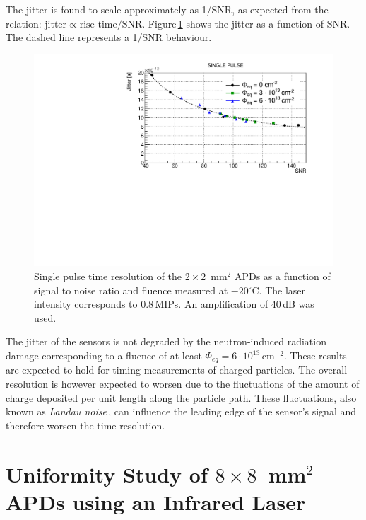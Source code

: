\documentclass[review,number,sort&compress]{elsarticle}
\begin{document}
The jitter is found to scale approximately as 1/SNR, as expected from the relation: $\textrm{jitter} \propto \textrm{rise time} / \textrm{SNR}$.
Figure\,\ref{fig:timeRes2x2_snr} shows the jitter as a function of SNR.
The dashed line represents a 1/SNR behaviour.

\begin{figure}
  \centering
  \includegraphics[width = 0.6 \columnwidth]{timeRes2x2APDsNo1e15_SNR}
  \caption{Single pulse time resolution of the $2 \times 2$~mm$^2$ APDs as a function of signal to noise ratio and fluence measured at $-20^\circ$C. The laser intensity corresponds to 0.8\,MIPs. An amplification of 40\,dB was used.}
  \label{fig:timeRes2x2_snr}
\end{figure}

The jitter of the sensors is not degraded by the neutron-induced radiation damage corresponding to a fluence of at least $\Phi_{eq} = 6 \cdot 10^{13}$\,cm$^{-2}$.
These results are expected to hold for timing measurements of charged particles.
The overall resolution is however expected to worsen due to the fluctuations of the amount of charge deposited per unit length along the particle path.
These fluctuations, also known as {\em Landau noise}\,\cite{cartiglia2017}, can influence the leading edge of the sensor's signal and therefore worsen the time resolution.

\section{Uniformity Study of $8 \times 8$~mm$^2$ APDs using an Infrared Laser}
\label{sec:unif8x8laser}
\end{document}
